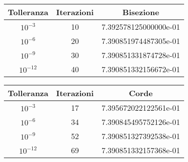 \begin{table}[ht!]
	\centering
	\small
	\begin{tabular}{| c | c | c | }
	\hline
	Tolleranza & Iterazioni & Bisezione\\
	\hline
	 $10^{-3}$ & 10 & 7.392578125000000e-01\\
	\hline
	$10^{-6}$  & 20 &  7.390851974487305e-01\\
	\hline
	$10^{-9}$  &  30 &7.390851331874728e-01\\
	\hline
	$10^{-12}$ & 40 & 7.390851332156672e-01\\
	\hline
	\end{tabular}
\end{table}

\begin{table}[ht!]
	\centering
	\small
	\begin{tabular}{| c | c | c | }
	\hline
	Tolleranza & Iterazioni & Corde\\
	\hline
	 $10^{-3}$ & 17 & 7.395672022122561e-01\\
	\hline
	$10^{-6}$  & 34 &7.390845495752126e-01\\
	\hline
	$10^{-9}$  & 52 & 7.390851327392538e-01\\
	\hline
	$10^{-12}$ & 69 &7.390851332157368e-01\\
	\hline
	\end{tabular}
\end{table}



